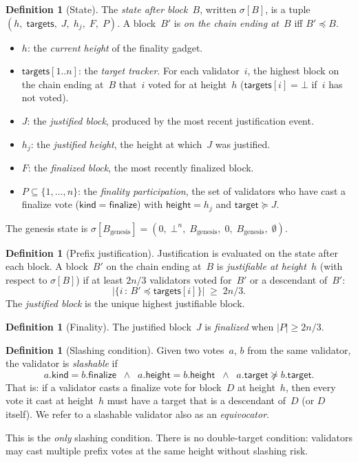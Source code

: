 \ifx\litemode\undefined\documentclass{article}\fi
\newcommand{\target}{\mathsf{target}}
\newcommand{\targets}{\mathsf{targets}}
\newcommand{\kind}{\mathsf{kind}}
\newcommand{\height}{\mathsf{height}}
\newcommand{\finalize}{\mathsf{finalize}}
\theoremstyle{plain}
\theoremstyle{definition}
\newtheorem{definition}[theorem]{Definition}
\theoremstyle{remark}
\begin{document}
\begin{definition}[State]\label{def:state}
The \emph{state after block~$B$}, written $\sigma[B]$, is a tuple $(h,\; \targets,\; J,\; h_j,\; F,\; P)$.
A block~$B'$ is \emph{on the chain ending at~$B$} iff $B' \preceq B$.
\begin{itemize}
  \item $h$: the \emph{current height} of the finality gadget.
  \item $\targets[1..n]$: the \emph{target tracker}.
        For each validator~$i$, the highest block on the chain ending at~$B$ that~$i$ voted for at height~$h$
        ($\targets[i] = \bot$ if~$i$ has not voted).
  \item $J$: the \emph{justified block}, produced by the most recent justification event.
  \item $h_j$: the \emph{justified height}, the height at which~$J$ was justified.
  \item $F$: the \emph{finalized block}, the most recently finalized block.
  \item $P \subseteq \{1, \ldots, n\}$: the \emph{finality participation}, the set of validators who have cast a finalize vote ($\kind = \finalize$) with $\height = h_j$ and $\target \succeq J$.
\end{itemize}
The genesis state is $\sigma[B_{\mathrm{genesis}}] = (0,\; \bot^n,\; B_{\mathrm{genesis}},\; 0,\; B_{\mathrm{genesis}},\; \emptyset)$.
\end{definition}

\begin{definition}[Prefix justification]\label{def:justification}
Justification is evaluated on the state after each block.
A block~$B'$ on the chain ending at~$B$ is \emph{justifiable at height~$h$} (with respect to $\sigma[B]$) if at least $2n/3$ validators voted for~$B'$ or a descendant of~$B'$:
\[
  \bigl|\{i \,:\, B' \preceq \targets[i]\}\bigr| \;\geq\; 2n/3.
\]
The \emph{justified block} is the unique highest justifiable block.
\end{definition}

\begin{definition}[Finality]\label{def:finality}
The justified block~$J$ is \emph{finalized} when $|P| \geq 2n/3$.
\end{definition}

\begin{definition}[Slashing condition]\label{def:slashing}
Given two votes~$a$, $b$ from the same validator, the validator is \emph{slashable} if
\[
  a.\kind = b.\finalize
  \;\;\wedge\;\;
  a.\height = b.\height
  \;\;\wedge\;\;
  a.\target  \not\succeq b.\target.
\]
That is: if a validator casts a finalize vote for block~$D$ at height~$h$, then every vote it cast at height~$h$ must have a target that is a descendant of~$D$ (or $D$ itself).
We refer to a slashable validator also as an \emph{equivocator}.

This is the \emph{only} slashing condition.
There is no double-target condition: validators may cast multiple prefix votes at the same height without slashing risk.
\end{definition}
\end{document}
